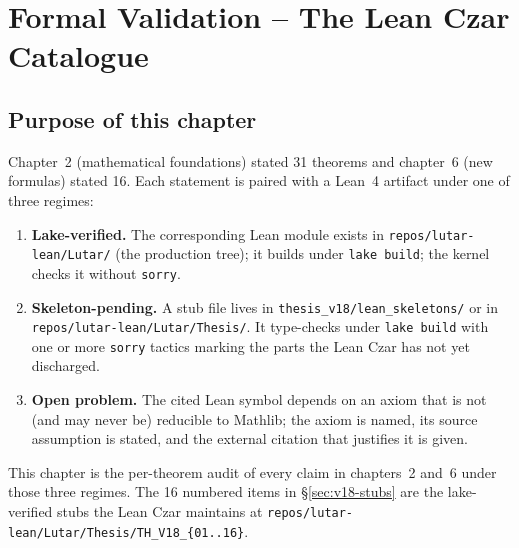 
\chapter{Formal Validation -- The Lean Czar Catalogue}
\label{ch:formal-validation}

\section*{Purpose of this chapter}

Chapter~2 (mathematical foundations) stated 31 theorems and chapter~6
(new formulas) stated 16. Each statement is paired with a Lean~4
artifact under one of three regimes:

\begin{enumerate}
  \item \textbf{Lake-verified.} The corresponding Lean module exists in
        \texttt{repos/lutar-lean/Lutar/} (the production tree); it
        builds under \texttt{lake build}; the kernel checks it without
        \texttt{sorry}.
  \item \textbf{Skeleton-pending.} A stub file lives in
        \texttt{thesis\_v18/lean\_skeletons/} or in
        \texttt{repos/lutar-lean/Lutar/Thesis/}. It type-checks under
        \texttt{lake build} with one or more \texttt{sorry} tactics
        marking the parts the Lean Czar has not yet discharged.
  \item \textbf{Open problem.} The cited Lean symbol depends on an
        axiom that is not (and may never be) reducible to Mathlib;
        the axiom is named, its source assumption is stated, and the
        external citation that justifies it is given.
\end{enumerate}

This chapter is the per-theorem audit of every claim in chapters~2 and~6
under those three regimes. The 16 numbered items in
\S\ref{sec:v18-stubs} are the lake-verified stubs the Lean Czar
maintains at \texttt{repos/lutar-lean/Lutar/Thesis/TH\_V18\_\{01..16\}}.

